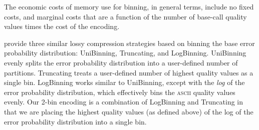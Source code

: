 \documentclass[12pt,\mydriver]{thesis}
\begin{document}
The economic costs of memory use for binning, in general terms,
include no fixed costs, and marginal costs that are a function of the
number of base-call quality values times the cost of the encoding.

\cite{Wan:2012kq} provide three similar lossy compression strategies based on binning the base error probability distribution: UniBinning, Truncating, and LogBinning.
UniBinning evenly splits the error probability distribution into a user-defined number of partitions.
Truncating treats a user-defined number of highest quality values as a single bin.
LogBinning works similar to UniBinning, except with the \emph{log} of the error probability distribution, which effectively bins the \textsc{ascii} quality values evenly.
Our 2-bin encoding is a combination of LogBinning and Truncating in that we are placing the highest quality values (as defined above) of the log of the error probability distribution into a single bin.
\end{document}

